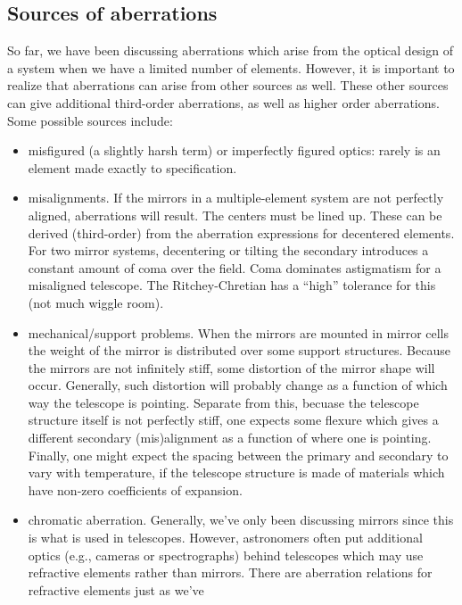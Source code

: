 \documentclass[12pt]{article}
\begin{document}
\subsection{Sources of aberrations}
So far, we have been discussing aberrations which arise from the
optical design of a system when we have a limited number of elements.
However, it is important to realize that aberrations can arise from
other sources as well. These other sources can give additional
third-order aberrations, as well as higher order aberrations. Some
possible sources include:
\begin{itemize}
    \item misfigured (a slightly harsh term)
        or imperfectly figured optics: rarely is an element made
        exactly to specification.
    \item misalignments. If the mirrors in a multiple-element system are not
        perfectly aligned, aberrations will result. The centers must be
        lined up. These can be derived
        (third-order) from the aberration expressions for decentered elements.
        For two mirror systems, decentering or tilting the
        secondary introduces a constant amount of coma over the field. Coma
        dominates astigmatism for a misaligned telescope.
        The Ritchey-Chretian has a ``high'' tolerance for this (not much
        wiggle room).
    \item mechanical/support problems. When the mirrors are mounted in mirror
        cells the weight of the mirror is distributed over some support
        structures. Because the mirrors are not infinitely stiff, some
        distortion of the mirror shape will occur. Generally, such distortion
        will probably change as a function of which way the telescope is
        pointing. Separate from this, becuase the telescope structure itself
        is not perfectly stiff, one expects some flexure which gives a
        different secondary (mis)alignment as a function of where one is
        pointing. Finally, one might expect the spacing between the primary
        and secondary to vary with temperature, if the telescope structure is
        made of materials which have non-zero coefficients of expansion.
    \item chromatic aberration. Generally, we've only been discussing mirrors
        since this is what is used in telescopes. However, astronomers often
        put additional optics (e.g., cameras or spectrographs) behind
        telescopes which may use refractive elements rather than mirrors.
        There are aberration relations for refractive elements just as we've

\end{itemize}
\end{document}
